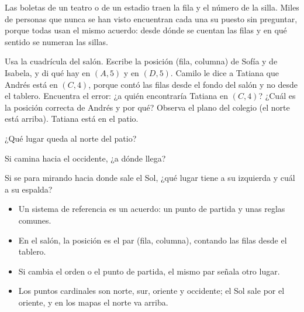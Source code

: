 \documentclass[11pt]{article}
\begin{document}
\begin{aplicacion}
Las boletas de un teatro o de un estadio traen la fila y el número de la silla. Miles de
personas que nunca se han visto encuentran cada una su puesto sin preguntar, porque todas usan
el mismo acuerdo: desde dónde se cuentan las filas y en qué sentido se numeran las sillas.
\end{aplicacion}

\begin{preguntas}
\pregunta Usa la cuadrícula del salón. Escribe la posición (fila, columna) de Sofía y de
Isabela, y di qué hay en $(A, 5)$ y en $(D, 5)$.
\pregunta Camilo le dice a Tatiana que Andrés está en $(C, 4)$, porque contó las filas desde el
fondo del salón y no desde el tablero. Encuentra el error: ¿a quién encontraría Tatiana en
$(C, 4)$? ¿Cuál es la posición correcta de Andrés y por qué?
\pregunta Observa el plano del colegio (el norte está arriba). Tatiana está en el patio.
\begin{opciones}
  \item ¿Qué lugar queda al norte del patio?
  \item Si camina hacia el occidente, ¿a dónde llega?
  \item Si se para mirando hacia donde sale el Sol, ¿qué lugar tiene a su izquierda y cuál a su
        espalda?
\end{opciones}
\end{preguntas}

\begin{resumen}
\begin{itemize}
  \item Un sistema de referencia es un acuerdo: un punto de partida y unas reglas comunes.
  \item En el salón, la posición es el par (fila, columna), contando las filas desde el tablero.
  \item Si cambia el orden o el punto de partida, el mismo par señala otro lugar.
  \item Los puntos cardinales son norte, sur, oriente y occidente; el Sol sale por el oriente, y
        en los mapas el norte va arriba.
\end{itemize}
\end{resumen}
\end{document}
